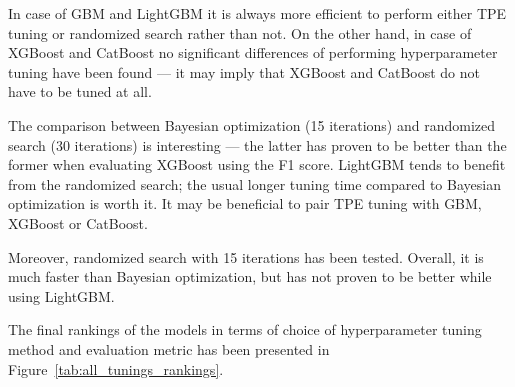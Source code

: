 \documentclass[magisterska, english]{pwr_wmat_praca_dyplomowa}
\theoremstyle{plain}
\numberwithin{theorem}{chapter}
\theoremstyle{definition}
\numberwithin{theorem}{chapter}
\begin{document}
In case of GBM and LightGBM it is always more efficient to perform either TPE tuning or randomized search rather than not. On the other hand, in case of XGBoost and CatBoost no significant differences of performing hyperparameter tuning have been found --- it may imply that XGBoost and CatBoost do not have to be tuned at all.

The comparison between Bayesian optimization (15 iterations) and randomized search (30 iterations) is interesting --- the latter has proven to be better than the former when evaluating XGBoost using the F1 score. LightGBM tends to benefit from the randomized search; the usual longer tuning time compared to Bayesian optimization is worth it. It may be beneficial to pair TPE tuning with GBM, XGBoost or CatBoost.

Moreover, randomized search with 15 iterations has been tested. Overall, it is much faster than Bayesian optimization, but has not proven to be better while using LightGBM.

The final rankings of the models in terms of choice of hyperparameter tuning method and evaluation metric has been presented in Figure~\ref{tab:all_tunings_rankings}.
\end{document}
